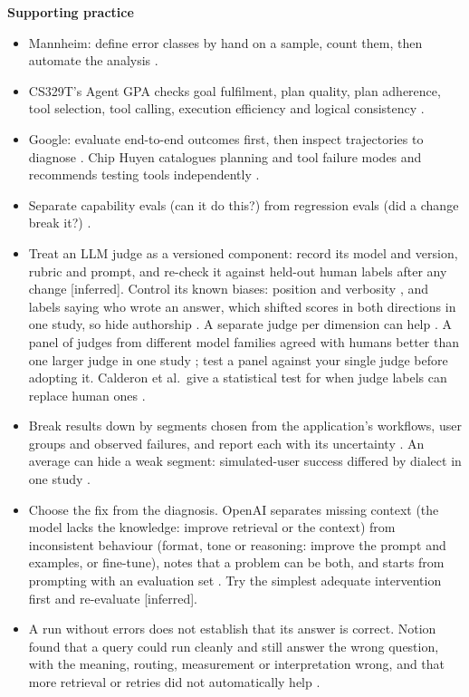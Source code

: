 \documentclass[10pt]{article}
\newcommand{\inferred}{\textsf{\small[inferred]}}
\begin{document}
\textbf{Supporting practice}
\begin{itemize}
\item Mannheim: define error classes by hand on a sample, count them, then automate the analysis \cite[slide~26]{mannheim}.
\item CS329T's Agent GPA checks goal fulfilment, plan quality, plan adherence, tool selection, tool calling, execution efficiency and logical consistency \cite[slide~21]{cs329tl3}.
\item Google: evaluate end-to-end outcomes first, then inspect trajectories to diagnose \cite[pp.~17--19]{gquality}. Chip Huyen catalogues planning and tool failure modes and recommends testing tools independently \cite{huyen}.
\item Separate capability evals (can it do this?) from regression evals (did a change break it?) \cite{anthevals}.
\item Treat an LLM judge as a versioned component: record its model and version, rubric and prompt, and re-check it against held-out human labels after any change \inferred. Control its known biases: position and verbosity \cite[``LLM-as-a-judge'']{oaievalbp}, and labels saying who wrote an answer, which shifted scores in both directions in one study, so hide authorship \cite[\S4.2]{chae}. A separate judge per dimension can help \cite[step~5]{anthevals}. A panel of judges from different model families agreed with humans better than one larger judge in one study \cite[\S4.2, Table~2]{verga}; test a panel against your single judge before adopting it. Calderon et al.\ give a statistical test for when judge labels can replace human ones \cite[\S3]{calderon}.
\item Break results down by segments chosen from the application's workflows, user groups and observed failures, and report each with its uncertainty \cite[Recommendations~1--2]{anthstats}. An average can hide a weak segment: simulated-user success differed by dialect in one study \cite[\S4.3]{seshadri}.
\item Choose the fix from the diagnosis. OpenAI separates missing context (the model lacks the knowledge: improve retrieval or the context) from inconsistent behaviour (format, tone or reasoning: improve the prompt and examples, or fine-tune), notes that a problem can be both, and starts from prompting with an evaluation set \cite[``LLM optimization context'', ``Understanding the tools'']{oaiaccuracy}. Try the simplest adequate intervention first and re-evaluate \inferred.
\item A run without errors does not establish that its answer is correct. Notion found that a query could run cleanly and still answer the wrong question, with the meaning, routing, measurement or interpretation wrong, and that more retrieval or retries did not automatically help \cite[``Why working SQL isn't enough'', ``Seeing what the agent actually did'']{notion}.

\end{itemize}
\end{document}
